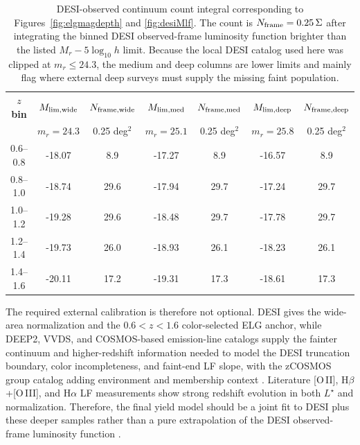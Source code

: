 \documentclass[10pt,onecolumn]{article}
\begin{document}
\begin{table}[tp]
\centering
\sffamily\scriptsize
\begin{tabularx}{\textwidth}{@{}c c c c c c c@{}}
\toprule
\textbf{$z$ bin} &
\textbf{$M_{\rm lim,wide}$} & \textbf{$N_{\rm frame,wide}$} &
\textbf{$M_{\rm lim,med}$} & \textbf{$N_{\rm frame,med}$} &
\textbf{$M_{\rm lim,deep}$} & \textbf{$N_{\rm frame,deep}$}\\
 & \multicolumn{1}{c}{$m_r=24.3$} & \multicolumn{1}{c}{0.25 deg$^2$} &
   \multicolumn{1}{c}{$m_r=25.1$} & \multicolumn{1}{c}{0.25 deg$^2$} &
   \multicolumn{1}{c}{$m_r=25.8$} & \multicolumn{1}{c}{0.25 deg$^2$}\\
\midrule
0.6--0.8 & -18.07 & 8.9 & -17.27 & 8.9 & -16.57 & 8.9\\
0.8--1.0 & -18.74 & 29.6 & -17.94 & 29.7 & -17.24 & 29.7\\
1.0--1.2 & -19.28 & 29.6 & -18.48 & 29.7 & -17.78 & 29.7\\
1.2--1.4 & -19.73 & 26.0 & -18.93 & 26.1 & -18.23 & 26.1\\
1.4--1.6 & -20.11 & 17.2 & -19.31 & 17.3 & -18.61 & 17.3\\
\bottomrule
\end{tabularx}
\caption{DESI-observed continuum count integral corresponding to Figures~\ref{fig:elgmagdepth} and \ref{fig:desiMlf}. The count is $N_{\rm frame}=0.25\,\Sigma$ after integrating the binned DESI observed-frame luminosity function brighter than the listed $M_r-5\log_{10}h$ limit. Because the local DESI catalog used here was clipped at $m_r\le24.3$, the medium and deep columns are lower limits and mainly flag where external deep surveys must supply the missing faint population.}
\label{tab:desiMcounts}
\end{table}

The required external calibration is therefore not optional. DESI gives the wide-area normalization and the $0.6<z<1.6$ color-selected ELG anchor, while DEEP2, VVDS, and COSMOS-based emission-line catalogs supply the fainter continuum and higher-redshift information needed to model the DESI truncation boundary, color incompleteness, and faint-end LF slope, with the zCOSMOS group catalog adding environment and membership context \cite{newman2013deep2,lefevre2013vvds,saito2020,knobel2012zcosmos}. Literature [O\,II], H$\beta$+[O\,III], and H$\alpha$ LF measurements show strong redshift evolution in both $L^\star$ and normalization. Therefore, the final yield model should be a joint fit to DESI plus these deeper samples rather than a pure extrapolation of the DESI observed-frame luminosity function \cite{comparat2015,comparat2016,khostovan2015,mehta2015}.
\end{document}
